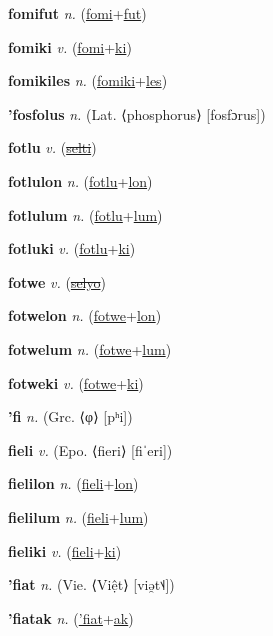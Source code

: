 \textbf{\hypertarget{fomifut}{fomifut}} \textit{n.} (\hyperlink{fomi}{fomi}+\allowbreak \hyperlink{fut}{fut})


\textbf{\hypertarget{fomiki}{fomiki}} \textit{v.} (\hyperlink{fomi}{fomi}+\allowbreak \hyperlink{ki}{ki})


\textbf{\hypertarget{fomikiles}{fomikiles}} \textit{n.} (\hyperlink{fomiki}{fomiki}+\allowbreak \hyperlink{les}{les})


\textbf{\hypertarget{'fosfolus}{'fosfolus}} \textit{n.} (Lat. ⟨phosphorus⟩ [fosfɔrus])


\textbf{\hypertarget{fotlu}{fotlu}} \textit{v.} (\hyperlink{selti}{\sout{selti}})


\textbf{\hypertarget{fotlulon}{fotlulon}} \textit{n.} (\hyperlink{fotlu}{fotlu}+\allowbreak \hyperlink{lon}{lon})


\textbf{\hypertarget{fotlulum}{fotlulum}} \textit{n.} (\hyperlink{fotlu}{fotlu}+\allowbreak \hyperlink{lum}{lum})


\textbf{\hypertarget{fotluki}{fotluki}} \textit{v.} (\hyperlink{fotlu}{fotlu}+\allowbreak \hyperlink{ki}{ki})


\textbf{\hypertarget{fotwe}{fotwe}} \textit{v.} (\hyperlink{selyo}{\sout{selyo}})


\textbf{\hypertarget{fotwelon}{fotwelon}} \textit{n.} (\hyperlink{fotwe}{fotwe}+\allowbreak \hyperlink{lon}{lon})


\textbf{\hypertarget{fotwelum}{fotwelum}} \textit{n.} (\hyperlink{fotwe}{fotwe}+\allowbreak \hyperlink{lum}{lum})


\textbf{\hypertarget{fotweki}{fotweki}} \textit{v.} (\hyperlink{fotwe}{fotwe}+\allowbreak \hyperlink{ki}{ki})


\textbf{\hypertarget{'fi}{'fi}} \textit{n.} (Grc. ⟨φ⟩ [pʰi])


\textbf{\hypertarget{fieli}{fieli}} \textit{v.} (Epo. ⟨fieri⟩ [fiˈeri])


\textbf{\hypertarget{fielilon}{fielilon}} \textit{n.} (\hyperlink{fieli}{fieli}+\allowbreak \hyperlink{lon}{lon})


\textbf{\hypertarget{fielilum}{fielilum}} \textit{n.} (\hyperlink{fieli}{fieli}+\allowbreak \hyperlink{lum}{lum})


\textbf{\hypertarget{fieliki}{fieliki}} \textit{v.} (\hyperlink{fieli}{fieli}+\allowbreak \hyperlink{ki}{ki})


\textbf{\hypertarget{'fiat}{'fiat}} \textit{n.} (Vie. ⟨Việt⟩ [viə̯t˦˨])


\textbf{\hypertarget{'fiatak}{'fiatak}} \textit{n.} (\hyperlink{'fiat}{'fiat}+\allowbreak \hyperlink{ak}{ak})


